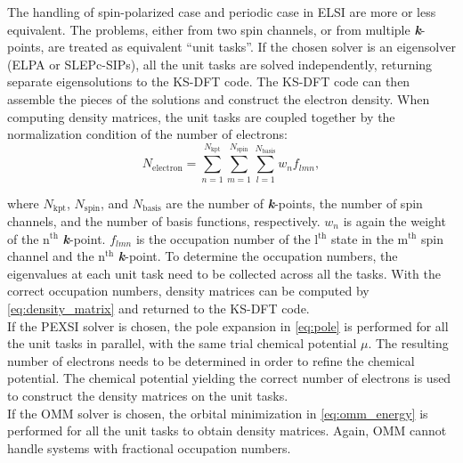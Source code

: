 \documentclass{report}
\begin{document}
The handling of spin-polarized case and periodic case in ELSI are more or less equivalent.  The problems, either from two spin channels, or from multiple \textbf{\textit{k}}-points, are treated as equivalent ``unit tasks''.  If the chosen solver is an eigensolver (ELPA or SLEPc-SIPs), all the unit tasks are solved independently, returning separate eigensolutions to the KS-DFT code.  The KS-DFT code can then assemble the pieces of the solutions and construct the electron density.  When computing density matrices, the unit tasks are coupled together by the normalization condition of the number of electrons:\\
\begin{equation}
\label{eq:normalization}
N_\text{electron} = \sum_{n=1}^{N_\text{kpt}} \sum_{m=1}^{N_\text{spin}} \sum_{l=1}^{N_\text{basis}} w_n f_{lmn} ,
\end{equation}

\noindent where $N_\text{kpt}$, $N_\text{spin}$, and $N_\text{basis}$ are the number of \textbf{\textit{k}}-points, the number of spin channels, and the number of basis functions, respectively.  $w_n$ is again the weight of the n$^\text{th}$ \textbf{\textit{k}}-point.  $f_{lmn}$ is the occupation number of the l$^\text{th}$ state in the m$^\text{th}$ spin channel and the n$^\text{th}$ \textbf{\textit{k}}-point.  To determine the occupation numbers, the eigenvalues at each unit task need to be collected across all the tasks.  With the correct occupation numbers, density matrices can be computed by \ref{eq:density_matrix} and returned to the KS-DFT code.\\

If the PEXSI solver is chosen, the pole expansion in \ref{eq:pole} is performed for all the unit tasks in parallel, with the same trial chemical potential $\mu$.  The resulting number of electrons needs to be determined in order to refine the chemical potential.  The chemical potential yielding the correct number of electrons is used to construct the density matrices on the unit tasks.\\

If the OMM solver is chosen, the orbital minimization in \ref{eq:omm_energy} is performed for all the unit tasks to obtain density matrices.  Again, OMM cannot handle systems with fractional occupation numbers.\\
\end{document}
